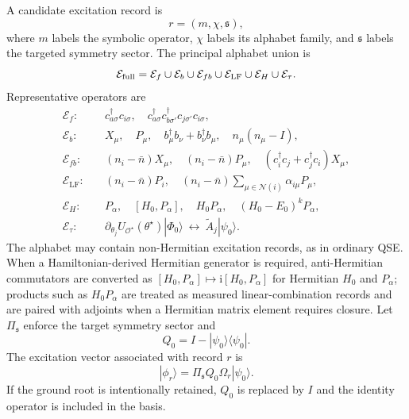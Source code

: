 \documentclass[
  reprint,
  amsmath,
  amssymb,
  aps,
  pra,
  nofootinbib,
  superscriptaddress,
  floatfix
]{revtex4-2}
\newcommand{\Oset}{\mathcal{O}}
\newcommand{\Ecal}{\mathcal{E}}
\newcommand{\ii}{\mathrm{i}}
\newcommand{\lf}{\mathrm{LF}}
\newcommand{\ket}[1]{|#1\rangle}
\newcommand{\bra}[1]{\langle #1|}
\begin{document}
A candidate excitation record is
\begin{equation}
r=(m,\chi,\mathfrak s),
\label{eq:qse_record}
\end{equation}
where $m$ labels the symbolic operator, $\chi$ labels its alphabet family, and $\mathfrak s$ labels the targeted symmetry sector.  The principal alphabet union is
\begin{equation}
\Ecal_{\rm full}
=
\Ecal_f\cup\Ecal_b\cup\Ecal_{fb}\cup\Ecal_{\lf}
\cup\Ecal_H\cup\Ecal_{\tau}.
\label{eq:alphabet_union}
\end{equation}
Representative operators are
\begin{align}
\Ecal_f:&\quad
c_{a\sigma}^\dagger c_{i\sigma},\quad
c_{a\sigma}^\dagger c_{b\sigma'}^\dagger c_{j\sigma'}c_{i\sigma},
\nonumber\\
\Ecal_b:&\quad
X_\mu,\quad P_\mu,\quad b_\mu^\dagger b_\nu+b_\nu^\dagger b_\mu,\quad n_\mu(n_\mu-I),
\nonumber\\
\Ecal_{fb}:&\quad
(n_i-\bar n)X_\mu,\quad (n_i-\bar n)P_\mu,\quad
(c_i^\dagger c_j+c_j^\dagger c_i)X_\mu,
\nonumber\\
\Ecal_{\lf}:&\quad
(n_i-\bar n)P_i,\quad
(n_i-\bar n)\sum_{\mu\in\mathcal N(i)}\alpha_{i\mu}P_\mu,
\nonumber\\
\Ecal_H:&\quad
P_\alpha,\quad [H_0,P_\alpha],\quad H_0P_\alpha,\quad (H_0-E_0)^kP_\alpha,
\nonumber\\
\Ecal_\tau:&\quad
\partial_{\theta_j}U_{\Oset^\star}(\theta^\star)\ket{\Phi_0}
\ \leftrightarrow\
\widetilde A_j\ket{\psi_0}.
\label{eq:alphabet_examples}
\end{align}
The alphabet may contain non-Hermitian excitation records, as in ordinary QSE.  When a Hamiltonian-derived Hermitian generator is required, anti-Hermitian commutators are converted as $[H_0,P_\alpha]\mapsto \ii[H_0,P_\alpha]$ for Hermitian $H_0$ and $P_\alpha$; products such as $H_0P_\alpha$ are treated as measured linear-combination records and are paired with adjoints when a Hermitian matrix element requires closure.
Let $\Pi_{\mathfrak s}$ enforce the target symmetry sector and
\begin{equation}
Q_0=I-\ket{\psi_0}\bra{\psi_0}.
\label{eq:q0}
\end{equation}
The excitation vector associated with record $r$ is
\begin{equation}
\ket{\phi_r}
=
\Pi_{\mathfrak s}Q_0\Omega_r\ket{\psi_0}.
\label{eq:qse_basis_state}
\end{equation}
If the ground root is intentionally retained, $Q_0$ is replaced by $I$ and the identity operator is included in the basis.
\end{document}
